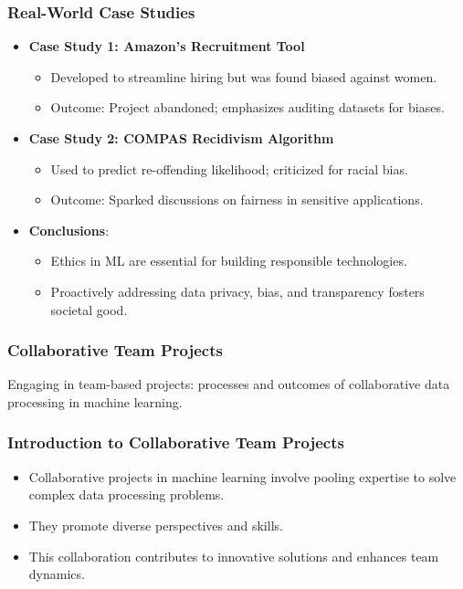 \documentclass[aspectratio=169]{beamer}
\begin{document}
\begin{frame}[fragile]
    \frametitle{Real-World Case Studies}
    \begin{itemize}
        \item \textbf{Case Study 1: Amazon’s Recruitment Tool}
            \begin{itemize}
                \item Developed to streamline hiring but was found biased against women.
                \item Outcome: Project abandoned; emphasizes auditing datasets for biases.
            \end{itemize}

        \item \textbf{Case Study 2: COMPAS Recidivism Algorithm}
            \begin{itemize}
                \item Used to predict re-offending likelihood; criticized for racial bias.
                \item Outcome: Sparked discussions on fairness in sensitive applications.
            \end{itemize}

        \item \textbf{Conclusions}:
            \begin{itemize}
                \item Ethics in ML are essential for building responsible technologies.
                \item Proactively addressing data privacy, bias, and transparency fosters societal good.
            \end{itemize}
    \end{itemize}
\end{frame}

\begin{frame}
    \frametitle{Collaborative Team Projects}
    Engaging in team-based projects: processes and outcomes of collaborative data processing in machine learning.
\end{frame}

\begin{frame}[fragile]
    \frametitle{Introduction to Collaborative Team Projects}
    \begin{itemize}
        \item Collaborative projects in machine learning involve pooling expertise to solve complex data processing problems.
        \item They promote diverse perspectives and skills.
        \item This collaboration contributes to innovative solutions and enhances team dynamics.
    \end{itemize}
\end{frame}
\end{document}
